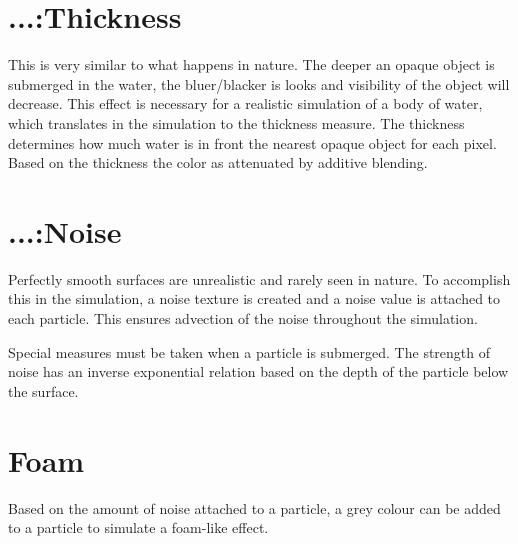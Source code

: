 \documentclass{article}
\begin{document}
\section{...:Thickness} %
\label{sec:_thickness}
This is very similar to what happens in nature. 
The deeper an opaque object is submerged in the water, the bluer/blacker is looks and visibility of the object will decrease.
This effect is necessary for a realistic simulation of a body of water, which translates in the simulation to the thickness measure.
The thickness determines how much water is in front the nearest opaque object for each pixel. Based on the thickness the color as attenuated by additive blending.

\section{...:Noise} %
\label{sec:noise}
Perfectly smooth surfaces are unrealistic and rarely seen in nature. To accomplish this in the simulation, a noise texture is created and a noise value is attached to each particle. This ensures advection of the noise throughout the simulation.

Special measures must be taken when a particle is submerged. The strength of noise has an inverse exponential relation based on the depth of the particle below the surface.

\section{Foam} %
\label{sec:foam}
Based on the amount of noise attached to a particle, a grey colour can be added to a particle to simulate a foam-like effect.
\end{document}
